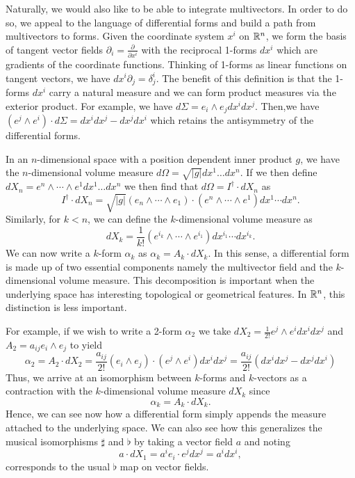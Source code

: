 Naturally, we would also like to be able to integrate multivectors.  In order to do so, we appeal to the language of differential forms and build a path from multivectors to forms. Given the coordinate system $x^i$ on $\mathbb{R}^n$, we form the basis of tangent vector fields $\partial_i = \frac{\partial}{\partial x^i}$ with the reciprocal 1-forms $dx^i$ which are gradients of the coordinate functions.  Thinking of 1-forms as linear functions on tangent vectors, we have $dx^i  \partial_j = \delta^i_j$.  The benefit of this definition is that the 1-forms $dx^i$ carry a natural measure and we can form product measures via the exterior product.  For example, we have $d\Sigma = e_i \wedge e_j dx^i dx^j$.  Then,we have $(e^j \wedge e^i)\cdot d\Sigma = dx^idx^j - dx^j dx^i$ which retains the antisymmetry of the differential forms. 

In an $n$-dimensional space with a position dependent inner product $g$, we have the $n$-dimensional volume measure $d\Omega = \sqrt{|g|} dx^1\dots dx^n$. If we then define $dX_n = e^n \wedge \cdots \wedge e^1 dx^1 \dots dx^n$ we then find that $d\Omega = I^\dagger \cdot dX_n$ as
\[
I^\dagger \cdot dX_n = \sqrt{|g|} (e_n \wedge \cdots \wedge e_1) \cdot (e^n \wedge \cdots \wedge e^1) dx^1 \cdots dx^n.
\]
Similarly, for $k<n$, we can define the $k$-dimensional volume measure as 
\[
dX_k = \frac{1}{k!}(e^{i_k}\wedge \cdots \wedge e^{i_1}) dx^{i_1} \cdots dx^{i_k}.
\]
We can now write a $k$-form $\alpha_k$ as $\alpha_k = A_k \cdot dX_k$. In this sense, a differential form is made up of two essential components namely the multivector field and the $k$-dimensional volume measure.  This decomposition is important when the underlying space has interesting topological or geometrical features. In $\mathbb{R}^n$, this distinction is less important. 

For example, if we wish to write a 2-form $\alpha_2$ we take $dX_2 = \frac{1}{2!} e^j \wedge e^i dx^i dx^j$ and $A_2 = a_{ij} e_i \wedge e_j$ to yield
\[
\alpha_2 = A_2 \cdot dX_2 = \frac{a_{ij}}{2!} (e_i \wedge e_j) \cdot (e^j \wedge e^i) dx^i dx^j = \frac{a_{ij}}{2!} (dx^i dx^j - dx^j dx^i)
\]
Thus, we arrive at an isomorphism between $k$-forms and $k$-vectors as a contraction with the $k$-dimensional volume measure $dX_k$ since
\[
\alpha_k = A_k \cdot dX_k.
\]
Hence, we can see now how a differential form simply appends the measure attached to the underlying space. We can also see how this generalizes the musical isomorphisms $\sharp$ and $\flat$ by taking a vector field $a$ and noting
\begin{equation}
\label{eq:line_element}
a \cdot dX_1 = a^i e_i \cdot e^j dx^j = a^i dx^i,
\end{equation}
corresponds to the usual $\flat$ map on vector fields.

